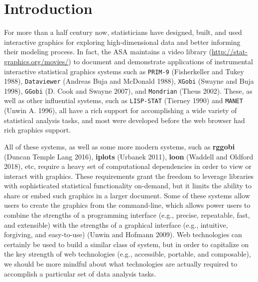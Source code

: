\documentclass[12pt,]{article}
\theoremstyle{definition}
\theoremstyle{definition}
\theoremstyle{definition}
\theoremstyle{remark}
\begin{document}
\newpage
{} %


\hypertarget{intro}{%
\section{Introduction}\label{intro}}

For more than a half century now, statisticians have designed, built,
and used interactive graphics for exploring high-dimensional data and
better informing their modeling process. In fact, the ASA maintains a
video library (\url{http://stat-graphics.org/movies/}) to document and
demonstrate applications of instrumental interactive statistical
graphics systems such as \texttt{PRIM-9} (Fisherkeller and Tukey 1988),
\texttt{Dataviewer} (Andreas Buja and McDonald 1988), \texttt{XGobi}
(Swayne and Buja 1998), \texttt{GGobi} (D. Cook and Swayne 2007), and
\texttt{Mondrian} (Theus 2002). These, as well as other influential
systems, such as \texttt{LISP-STAT} (Tierney 1990) and \texttt{MANET}
(Unwin A. 1996), all have a rich support for accomplishing a wide
variety of statistical analysis tasks, and most were developed before
the web browser had rich graphics support.

All of these systems, as well as some more modern systems, such as
\textbf{rggobi} (Duncan Temple Lang 2016), \textbf{iplots} (Urbanek
2011), \textbf{loon} (Waddell and Oldford 2018), etc, require a heavy
set of computational dependencies in order to view or interact with
graphics. These requirements grant the freedom to leverage libraries
with sophisticated statistical functionality on-demand, but it limits
the ability to share or embed such graphics in a larger document. Some
of these systems allow users to create the graphics from the
command-line, which allows power users to combine the strengths of a
programming interface (e.g., precise, repeatable, fast, and extensible)
with the strengths of a graphical interface (e.g., intuitive, forgiving,
and easy-to-use) (Unwin and Hofmann 2009). Web technologies can
certainly be used to build a similar class of system, but in order to
capitalize on the key strength of web technologies (e.g., accessible,
portable, and composable), we should be more mindful about what
technologies are actually required to accomplish a particular set of
data analysis tasks.
\end{document}

